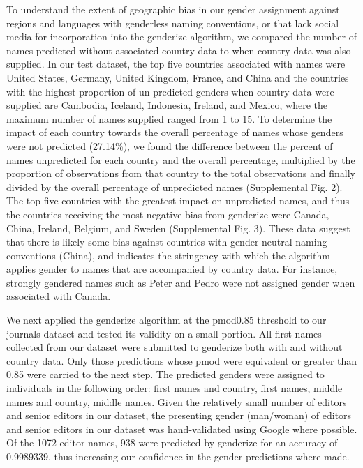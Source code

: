 \documentclass[11pt,]{article}
\begin{document}
To understand the extent of geographic bias in our gender assignment
against regions and languages with genderless naming conventions, or
that lack social media for incorporation into the genderize algorithm,
we compared the number of names predicted without associated country
data to when country data was also supplied. In our test dataset, the
top five countries associated with names were United States, Germany,
United Kingdom, France, and China and the countries with the highest
proportion of un-predicted genders when country data were supplied are
Cambodia, Iceland, Indonesia, Ireland, and Mexico, where the maximum
number of names supplied ranged from 1 to 15. To determine the impact of
each country towards the overall percentage of names whose genders were
not predicted (27.14\%), we found the difference between the percent of
names unpredicted for each country and the overall percentage,
multiplied by the proportion of observations from that country to the
total observations and finally divided by the overall percentage of
unpredicted names (Supplemental Fig. 2). The top five countries with the
greatest impact on unpredicted names, and thus the countries receiving
the most negative bias from genderize were Canada, China, Ireland,
Belgium, and Sweden (Supplemental Fig. 3). These data suggest that there
is likely some bias against countries with gender-neutral naming
conventions (China), and indicates the stringency with which the
algorithm applies gender to names that are accompanied by country data.
For instance, strongly gendered names such as Peter and Pedro were not
assigned gender when associated with Canada.

We next applied the genderize algorithm at the pmod0.85 threshold to our
journals dataset and tested its validity on a small portion. All first
names collected from our dataset were submitted to genderize both with
and without country data. Only those predictions whose pmod were
equivalent or greater than 0.85 were carried to the next step. The
predicted genders were assigned to individuals in the following order:
first names and country, first names, middle names and country, middle
names. Given the relatively small number of editors and senior editors
in our dataset, the presenting gender (man/woman) of editors and senior
editors in our dataset was hand-validated using Google where possible.
Of the 1072 editor names, 938 were predicted by genderize for an
accuracy of 0.9989339, thus increasing our confidence in the gender
predictions where made.
\end{document}
